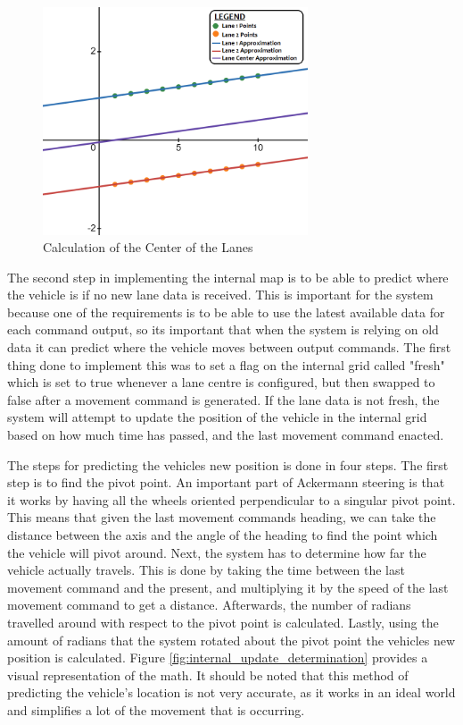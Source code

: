 \documentclass[titlepage,draft]{article}
\begin{document}
{\begin{figure}
	\centering
	\includegraphics[width=0.7\textwidth]{lane_center}
	\caption{Calculation of the Center of the Lanes}
	\label{fig:lane_center_determination}
\end{figure}

The second step in implementing the internal map is to be able to predict where the vehicle is if no new lane data is received. This is important for the system because one of the requirements is to be able to use the latest available data for each command output, so its important that when the system is relying on old data it can predict where the vehicle moves between output commands. The first thing done to implement this was to set a flag on the internal grid called "fresh" which is set to true whenever a lane centre is configured, but then swapped to false after a movement command is generated. If the lane data is not fresh, the system will attempt to update the position of the vehicle in the internal grid based on how much time has passed, and the last movement command enacted.

The steps for predicting the vehicles new position is done in four steps. The first step is to find the pivot point. An important part of Ackermann steering is that it works by having all the wheels oriented perpendicular to a singular pivot point. This means that given the last movement commands heading, we can take the distance between the axis and the angle of the heading to find the point which the vehicle will pivot around. Next, the system has to determine how far the vehicle actually travels. This is done by taking the time between the last movement command and the present, and multiplying it by the speed of the last movement command to get a distance. Afterwards, the number of radians travelled around with respect to the pivot point is calculated. Lastly, using the amount of radians that the system rotated about the pivot point the vehicles new position is calculated. Figure \ref{fig:internal_update_determination} provides a visual representation of the math. It should be noted that this method of predicting the vehicle's location is not very accurate, as it works in an ideal world and simplifies a lot of the movement that is occurring.

}
\end{document}
